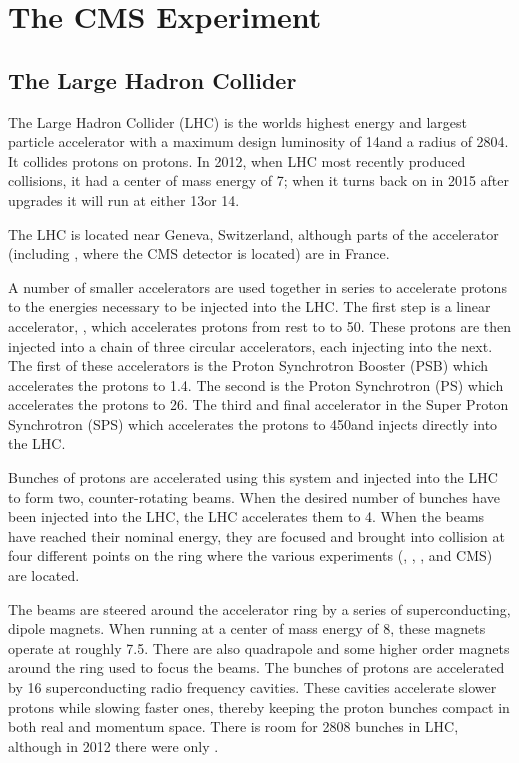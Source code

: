 
\chapter{The CMS Experiment}
\label{experiment_chapter}

\section{The Large Hadron Collider}
\label{lhc_section}


The Large Hadron Collider (LHC) is the worlds highest energy and largest
particle accelerator with a maximum design luminosity of 14\TeV and a radius of
2804\meters \cite{bruning2004}. It collides protons on protons. In 2012, when
LHC most recently produced collisions, it had a center of mass energy of 7\TeV;
when it turns back on in 2015 after upgrades it will run at either 13\TeV or
14\TeV.

The LHC is located near Geneva, Switzerland, although parts of the accelerator
(including \pointfive, where the CMS detector is located) are in France.

A number of smaller accelerators are used together in series to accelerate
protons to the energies necessary to be injected into the LHC. The first step
is a linear accelerator, \linactwo, which accelerates protons from rest to to
50\MeV. These protons are then injected into a chain of three circular
accelerators, each injecting into the next. The first of these accelerators is
the Proton Synchrotron Booster (PSB) which accelerates the protons to 1.4\GeV.
The second is the Proton Synchrotron (PS) which accelerates the protons to
26\GeV. The third and final accelerator in the Super Proton Synchrotron (SPS)
which accelerates the protons to 450\GeV and injects directly into the LHC.

Bunches of protons are accelerated using this system and injected into the LHC
to form two, counter-rotating beams. When the desired number of bunches have
been injected into the LHC, the LHC accelerates them to 4\TeV. When the beams
have reached their nominal energy, they are focused and brought into collision
at four different points on the ring where the various experiments (\ALICE,
\ATLAS, \LHCB, and CMS) are located.

The beams are steered around the accelerator ring by a series of
superconducting, dipole magnets. When running at a center of mass energy of
8\TeV, these magnets operate at roughly 7.5\Tesla. There are also quadrapole
and some higher order magnets around the ring used to focus the beams. The
bunches of protons are accelerated by 16 superconducting radio frequency
cavities. These cavities accelerate slower protons while slowing faster ones,
thereby keeping the proton bunches compact in both real and momentum space.
There is room for 2808 bunches in LHC, although in 2012 there were only
.

